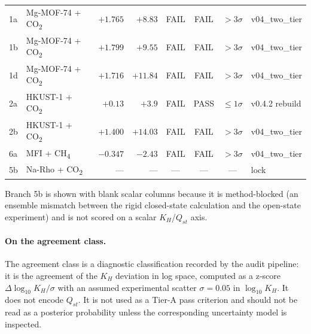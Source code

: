 {\begin{longtable}{@{}l>{\raggedright\arraybackslash}p{}rrcccl@{}}
1a & Mg-MOF-74 + CO\textsubscript{2} & $+1.765$ & $+8.83$ & FAIL & FAIL & $>3\sigma$ & v04\_two\_tier \\
1b & Mg-MOF-74 + CO\textsubscript{2} & $+1.799$ & $+9.55$ & FAIL & FAIL & $>3\sigma$ & v04\_two\_tier \\
1d & Mg-MOF-74 + CO\textsubscript{2} & $+1.716$ & $+11.84$ & FAIL & FAIL & $>3\sigma$ & v04\_two\_tier \\
2a & HKUST-1 + CO\textsubscript{2} & $+0.13$ & $+3.9$ & FAIL & PASS & $\le 1\sigma$ & v0.4.2 rebuild \\
2b & HKUST-1 + CO\textsubscript{2} & $+1.400$ & $+14.03$ & FAIL & FAIL & $>3\sigma$ & v04\_two\_tier \\
6a & MFI + CH\textsubscript{4} & $-0.347$ & $-2.43$ & FAIL & FAIL & $>3\sigma$ & v04\_two\_tier \\
\addlinespace[2pt]
5b & Na-Rho + CO\textsubscript{2} & --- & --- & --- & --- & --- & lock \\
\end{longtable}
}

Branch 5b is shown with blank scalar columns because it is method-blocked (an ensemble mismatch between the rigid closed-state calculation and the open-state experiment) and is not scored on a scalar \(K_H\)/\(Q_{st}\) axis.

\paragraph{On the agreement class.} The agreement class is a diagnostic classification recorded by the audit pipeline: it is the agreement of the \(K_H\) deviation in log space, computed as a z-score \(\Delta\log_{10}K_H / \sigma\) with an assumed experimental scatter \(\sigma = 0.05\) in \(\log_{10}K_H\). It does not encode \(Q_{st}\). It is not used as a Tier-A pass criterion and should not be read as a posterior probability unless the corresponding uncertainty model is inspected.

\FloatBarrier
